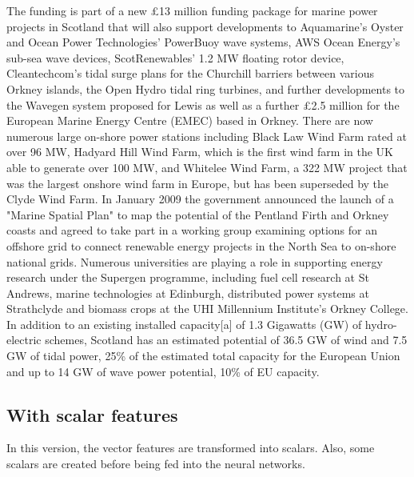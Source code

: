 \begin{tcolorbox}\footnotesize
	The funding is part of a new £13 million funding package for marine power projects in Scotland that will also support developments to Aquamarine's Oyster and Ocean Power Technologies' PowerBuoy wave systems, AWS Ocean Energy's sub-sea wave devices, ScotRenewables' 1.2 MW floating rotor device, Cleantechcom's tidal surge plans for the Churchill barriers between various Orkney islands, the Open Hydro tidal ring turbines, and further developments to the Wavegen system proposed for Lewis as well as a further £2.5 million for the European Marine Energy Centre (EMEC) based in Orkney.
	There are now numerous large on-shore power stations including Black Law Wind Farm rated at over 96 MW, Hadyard Hill Wind Farm, which is the first wind farm in the UK able to generate over 100 MW, and Whitelee Wind Farm, a 322 MW project that was the largest onshore wind farm in Europe, but has been superseded by the Clyde Wind Farm.
	In January 2009 the government announced the launch of a "Marine Spatial Plan" to map the potential of the Pentland Firth and Orkney coasts and agreed to take part in a working group examining options for an offshore grid to connect renewable energy projects in the North Sea to on-shore national grids.
	Numerous universities are playing a role in supporting energy research under the Supergen programme, including fuel cell research at St Andrews, marine technologies at Edinburgh, distributed power systems at Strathclyde and biomass crops at the UHI Millennium Institute's Orkney College.
	In addition to an existing installed capacity[a] of 1.3 Gigawatts (GW) of hydro-electric schemes, Scotland has an estimated potential of 36.5 GW of wind and 7.5 GW of tidal power, 25\% of the estimated total capacity for the European Union and up to 14 GW of wave power potential, 10\% of EU capacity.
\end{tcolorbox}	

\subsection{With scalar features}

In this version, the vector features are transformed into scalars.
Also, some scalars are created before being fed into the neural networks.

